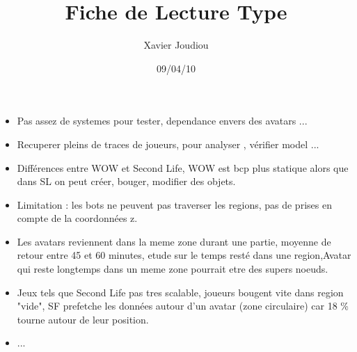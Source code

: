 \documentclass[11pt,a4paper]{article}
\title{Fiche de Lecture Type}
\author{Xavier Joudiou}
\date{09/04/10}
\begin{document}
	
  \begin{itemize}
  \renewcommand{\labelitemi}{$\Rightarrow$}
	\item Pas assez de systemes pour tester, dependance envers des avatars ...
	\item Recuperer pleins de traces de joueurs, pour analyser , vérifier model ...
	\item Différences entre WOW et Second Life, WOW est bcp plus statique alors que dans SL on peut créer, bouger, modifier des objets.
	\item Limitation : les bots ne peuvent pas traverser les regions, pas de prises en compte de la coordonnées z.
	\item Les avatars reviennent dans la meme zone durant une partie, moyenne de retour entre 45 et 60 minutes, etude sur le temps resté dans une region,Avatar qui reste longtemps dans un meme zone  pourrait etre des supers noeuds.
	\item Jeux tels que Second Life pas tres scalable, joueurs bougent vite dans region "vide", SF prefetche les données autour d'un avatar (zone circulaire) car 18 \% tourne autour de leur position.
	\item ...
  \end{itemize}
\end{document}
